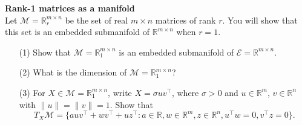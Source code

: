 \documentclass[en, oneside]{assignment}
\begin{document}
\begin{prob} \textbf{Rank-1 matrices as a manifold}\\
    Let $\mathcal{M} = \mathbb{R}^{m \times n}_r$ be the set of real $m \times n$ matrices of rank $r$.
    You will show that this set is an embedded submanifold of $\mathbb{R}^{m \times n}$ when $r = 1$.
    \begin{itemize}
        \item[(1)] Show that $\mathcal{M} = \mathbb{R}^{m \times n}_1$ is an embedded submanifold of $\mathcal{E} = \mathbb{R}^{m \times n}$.
        \item[(2)] What is the dimension of $\mathcal{M}= \mathbb{R}^{m \times n}_1$?
        \item[(3)] For \( X \in \mathcal{M} = \mathbb{R}_1^{m \times n} \), 
        write \( X = \sigma u v^\top \), where \( \sigma > 0 \) and \( u \in \mathbb{R}^m \), \( v \in \mathbb{R}^n \) with \( \| u \| = \| v \| = 1 \). 
        Show that
        \begin{equation*}
        T_X \mathcal{M} = \{ a u v^\top + w v^\top + u z^\top : a \in \mathbb{R}, w \in \mathbb{R}^m, z \in \mathbb{R}^n, u^\top w = 0, v^\top z = 0 \}.
        \end{equation*}
    \end{itemize}
\end{prob}
\end{document}

